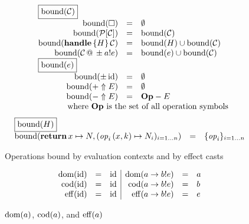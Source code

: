 \begin{figure}
\[
\begin{array}{rcl}
\multicolumn{3}{l}{\fbox{$\bound{\xC}$}} \\
  \bound{\square} & = & \emptyset \\
  \bound{\context{\xP}{\xC}} & = & \bound{\xC} \\
  \bound{\handle{H}{\xC}} & = & \bound{H} \cup \bound{\xC} \\
  \bound{\cast{\xC}{\pm \cty{e}{a}}} & = & \bound{e} \cup \bound{\xC} \\
\multicolumn{3}{l}{\fbox{$\bound{e}$}} \\
  \bound{\pm\, \cid} & = & \emptyset \\
  \bound{+ \Uparrow E} & = & \emptyset \\
  \bound{- \Uparrow E} & = & \mathbf{Op} - E \\
  && \quad \makebox[0pt]{\text{where $\mathbf{Op}$ is the set of all operation symbols} }
\end{array}
\]
\[
\begin{array}{rcl}
\multicolumn{3}{l}{\fbox{$\bound{H}$}} \\
  \bound{\treturn{x}\mapsto N, \fori{i}{n}{\perform{\effop_i}{x,k} \mapsto N_i}}
    &=& \foriset{i}{n}{\effop_i}
\end{array}
\]
\caption{Operations bound by evaluation contexts and by effect casts}
\end{figure}

\begin{figure}
$$
\begin{array}{rcl|rcl}
  \dom{\cid} & = & \cid &
  \dom{a \to \cty{e}{b}} & = & a \\
  \cod{\cid} & = & \cid &
  \cod{a \to \cty{e}{b}} & = & b \\
  \codeff{\cid} & = & \cid &
  \codeff{a \to \cty{e}{b}} & = & e
\end{array}
$$
\caption{$\dom{a}$, $\cod{a}$, and $\codeff{a}$}
\end{figure}

